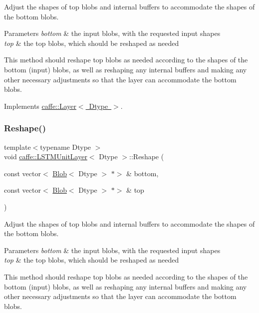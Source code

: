 Adjust the shapes of top blobs and internal buffers to accommodate the shapes of the bottom blobs. 


\begin{DoxyParams}{Parameters}
{\em bottom} & the input blobs, with the requested input shapes \\
\hline
{\em top} & the top blobs, which should be reshaped as needed\\
\hline
\end{DoxyParams}
This method should reshape top blobs as needed according to the shapes of the bottom (input) blobs, as well as reshaping any internal buffers and making any other necessary adjustments so that the layer can accommodate the bottom blobs. 

Implements \mbox{\hyperlink{classcaffe_1_1_layer_a7fe981e8af8d93d587acf2a952be563d}{caffe\+::\+Layer$<$ Dtype $>$}}.

\mbox{\label{classcaffe_1_1_l_s_t_m_unit_layer_a795bd455f4635e876de32323e9cee96d}} 
\subsubsection{\texorpdfstring{Reshape()}{Reshape()}\hspace{0.1cm}{\footnotesize\ttfamily [2/2]}}
{\footnotesize\ttfamily template$<$typename Dtype $>$ \\
void \mbox{\hyperlink{classcaffe_1_1_l_s_t_m_unit_layer}{caffe\+::\+L\+S\+T\+M\+Unit\+Layer}}$<$ Dtype $>$\+::Reshape (\begin{DoxyParamCaption}\item[{const vector$<$ \mbox{\hyperlink{classcaffe_1_1_blob}{Blob}}$<$ Dtype $>$ $\ast$$>$ \&}]{bottom,  }\item[{const vector$<$ \mbox{\hyperlink{classcaffe_1_1_blob}{Blob}}$<$ Dtype $>$ $\ast$$>$ \&}]{top }\end{DoxyParamCaption})\hspace{0.3cm}{\ttfamily [virtual]}}



Adjust the shapes of top blobs and internal buffers to accommodate the shapes of the bottom blobs. 


\begin{DoxyParams}{Parameters}
{\em bottom} & the input blobs, with the requested input shapes \\
\hline
{\em top} & the top blobs, which should be reshaped as needed\\
\hline
\end{DoxyParams}
This method should reshape top blobs as needed according to the shapes of the bottom (input) blobs, as well as reshaping any internal buffers and making any other necessary adjustments so that the layer can accommodate the bottom blobs. 

